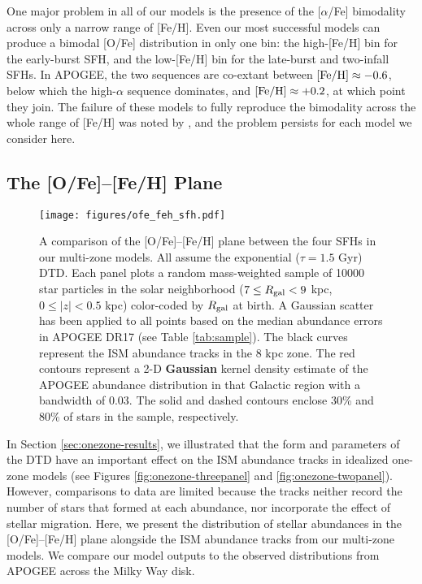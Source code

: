 \documentclass[twocolumn,twocolappendix,linenumbers]{aastex631}
\newcommand{\aFe}{[$\alpha$/Fe]\xspace}
\begin{document}
One major problem in all of our models is the presence of the \aFe bimodality across only a narrow range of [Fe/H]. Even our most successful models can produce a bimodal [O/Fe] distribution in only one bin: the high-[Fe/H] bin for the early-burst SFH, and the low-[Fe/H] bin for the late-burst and two-infall SFHs. In APOGEE, the two sequences are co-extant between ${\rm [Fe/H]}\approx-0.6$, below which the high-$\alpha$ sequence dominates, and ${\rm [Fe/H]}\approx+0.2$, at which point they join. The failure of these models to fully reproduce the bimodality across the whole range of [Fe/H] was noted by , and the problem persists for each model we consider here.

\subsection{The [O/Fe]--[Fe/H] Plane}
\label{sec:ofe-feh}

\begin{figure}
    \centering
    \texttt{[image: figures/ofe\_feh\_sfh.pdf]}
    \caption{A comparison of the [O/Fe]--[Fe/H] plane between the four SFHs in our multi-zone models. All assume the exponential ($\tau=1.5$ Gyr) DTD. Each panel plots a random mass-weighted sample of \num{10000} star particles in the solar neighborhood ($7\leq R_{\rm gal}<9$ kpc, $0\leq|z|<0.5$ kpc) color-coded by $R_{\rm gal}$ at birth. A Gaussian scatter has been applied to all points based on the median abundance errors in APOGEE DR17 (see Table \ref{tab:sample}). The black curves represent the ISM abundance tracks in the 8 kpc zone. The red contours represent a 2-D {\bf Gaussian} kernel density estimate of the APOGEE abundance distribution in that Galactic region with a bandwidth of 0.03. The solid and dashed contours enclose 30\% and 80\% of stars in the sample, respectively.}
    \label{fig:ofe-feh-sfh}
\end{figure}

In Section \ref{sec:onezone-results}, we illustrated that the form and parameters of the DTD have an important effect on the ISM abundance tracks in idealized one-zone models (see Figures \ref{fig:onezone-threepanel} and \ref{fig:onezone-twopanel}). However, comparisons to data are limited because the tracks neither record the number of stars that formed at each abundance, nor incorporate the effect of stellar migration. Here, we present the distribution of stellar abundances in the [O/Fe]--[Fe/H] plane alongside the ISM abundance tracks from our multi-zone models. We compare our model outputs to the observed distributions from APOGEE across the Milky Way disk.
\end{document}

